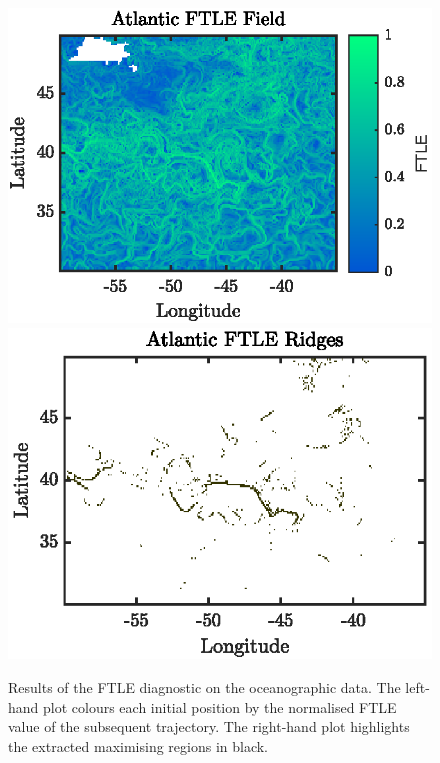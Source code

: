 \documentclass[a4paper, fontsize=12pt]{article}
\begin{document}
 \begin{figure}
\begin{center}
	\includegraphics[scale=1]{../figures/atlantic_ftle.eps}%
	\includegraphics[scale=1]{../figures/atlantic_ftle_ridges.eps}
	\caption{Results of the FTLE diagnostic on the oceanographic data. The left-hand plot colours each initial position by the normalised FTLE value of the subsequent trajectory. The right-hand plot highlights the extracted maximising regions in black.}
	\label{fig:atlantic_ftle}
\end{center}
\end{figure}
\end{document}
